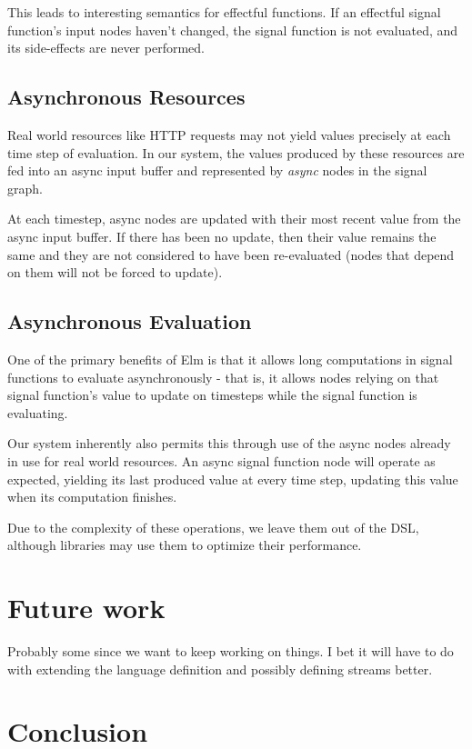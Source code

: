 \documentclass[twocolumn,11pt,english]{article}
\begin{document}
This leads to interesting semantics for effectful functions. If an effectful signal function's input nodes haven't changed, the signal function is not evaluated, and its side-effects are never performed. 


\subsection{Asynchronous Resources}
  Real world resources like HTTP requests may not yield values precisely at each time step of evaluation. In our system, the values produced by these resources are fed into an async input buffer and represented by \textit{async} nodes in the signal graph. 

At each timestep, async nodes are updated with their most recent value from the async input buffer. If there has been no update, then their value remains the same and they are not considered to have been re-evaluated (nodes that depend on them will not be forced to update). 

\subsection{Asynchronous Evaluation}
One of the primary benefits of Elm \cite{czaplicki2013asynchronous} is that it allows long computations in signal functions to evaluate asynchronously - that is, it allows nodes relying on that signal function's value to update on timesteps while the signal function is evaluating. 

Our system inherently also permits this through use of the async nodes already in use for real world resources. An async signal function node will operate as expected, yielding its last produced value at every time step, updating this value when its computation finishes.

Due to the complexity of these operations, we leave them out of the DSL, although libraries may use them to optimize their performance. 

\section{Future work}
Probably some since we want to keep working on things. I bet it will have to do with extending the language definition and possibly defining streams better.

\section{Conclusion}

\newpage
\newpage


\end{document}
